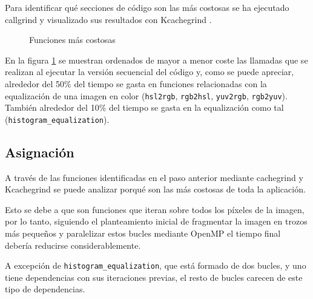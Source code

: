 \documentclass[12pt]{report} %
\begin{document}
Para identificar qué secciones de código son las más costosas se ha ejecutado callgrind y visualizado sus
resultados con Kcachegrind \parencite{weidendorfer_kcachegrind_2013}. 

\begin{figure}[H]
    \caption{Funciones más costosas}
    \label{fig:kcachegrind}
\end{figure}

En la figura \ref{fig:kcachegrind}  se muestran ordenados de mayor a menor coste las llamadas que se
realizan al ejecutar la versión secuencial del código y, como se puede apreciar, alrededor del 50\% del tiempo
se gasta en funciones relacionadas con la equalización de una imagen en color (\texttt{hsl2rgb}, \texttt{rgb2hsl},
\texttt{yuv2rgb}, \texttt{rgb2yuv}). También alrededor del 10\% del tiempo se gasta en la equalización como tal
(\texttt{histogram\_equalization}).


\subsection{Asignación}

A través de las funciones identificadas en el paso anterior mediante cachegrind y Kcachegrind se puede
analizar porqué son las más costosas de toda la aplicación.

Esto se debe a que son funciones que iteran sobre todos los píxeles de la imagen, por lo tanto, siguiendo el
planteamiento inicial de fragmentar la imagen en trozos más pequeños y paralelizar estos bucles mediante
OpenMP el tiempo final debería reducirse considerablemente.

A excepción de \texttt{histogram\_equalization}, que está formado de dos bucles, y uno tiene dependencias
con sus iteraciones previas, el resto de bucles carecen de este tipo de dependencias.
\end{document}
